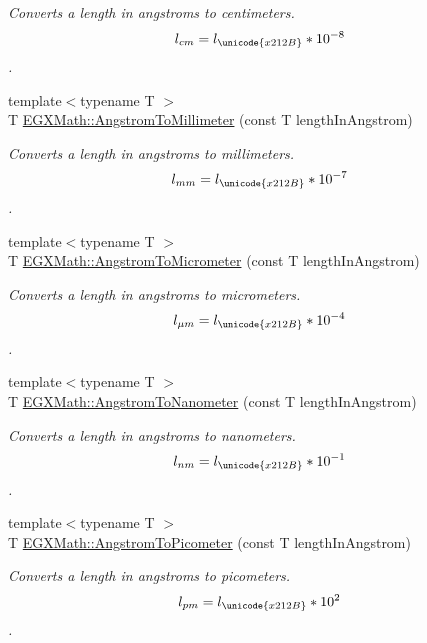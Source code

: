 \begin{DoxyCompactItemize}
\begin{DoxyCompactList}\small\item\em Converts a length in angstroms to centimeters. \[ l_{cm}=l_{\unicode{x212B}} * 10^{-8} \]. \end{DoxyCompactList}\item 
{\footnotesize template$<$typename T $>$ }\\T \mbox{\hyperlink{group___e_g_x_math-_conversions-_length_conversions-_non-_s_i-_angstrom-_s_i_ga5c25ae7d55cebff67920d7c059d1e28e}{E\+G\+X\+Math\+::\+Angstrom\+To\+Millimeter}} (const T length\+In\+Angstrom)
\begin{DoxyCompactList}\small\item\em Converts a length in angstroms to millimeters. \[ l_{mm}=l_{\unicode{x212B}} * 10^{-7} \]. \end{DoxyCompactList}\item 
{\footnotesize template$<$typename T $>$ }\\T \mbox{\hyperlink{group___e_g_x_math-_conversions-_length_conversions-_non-_s_i-_angstrom-_s_i_gab15b376d5a5fc7896a5f5cb6278f782c}{E\+G\+X\+Math\+::\+Angstrom\+To\+Micrometer}} (const T length\+In\+Angstrom)
\begin{DoxyCompactList}\small\item\em Converts a length in angstroms to micrometers. \[ l_{\mu m}=l_{\unicode{x212B}} * 10^{-4} \]. \end{DoxyCompactList}\item 
{\footnotesize template$<$typename T $>$ }\\T \mbox{\hyperlink{group___e_g_x_math-_conversions-_length_conversions-_non-_s_i-_angstrom-_s_i_ga2b95587436f6db9aa13e6071769058e0}{E\+G\+X\+Math\+::\+Angstrom\+To\+Nanometer}} (const T length\+In\+Angstrom)
\begin{DoxyCompactList}\small\item\em Converts a length in angstroms to nanometers. \[ l_{nm}=l_{\unicode{x212B}} * 10^{-1} \]. \end{DoxyCompactList}\item 
{\footnotesize template$<$typename T $>$ }\\T \mbox{\hyperlink{group___e_g_x_math-_conversions-_length_conversions-_non-_s_i-_angstrom-_s_i_ga59612970b9b51a1a900a76789ffaaf28}{E\+G\+X\+Math\+::\+Angstrom\+To\+Picometer}} (const T length\+In\+Angstrom)
\begin{DoxyCompactList}\small\item\em Converts a length in angstroms to picometers. \[ l_{pm}=l_{\unicode{x212B}} * 10^{2} \]. \end{DoxyCompactList}\item 

\end{DoxyCompactItemize}
